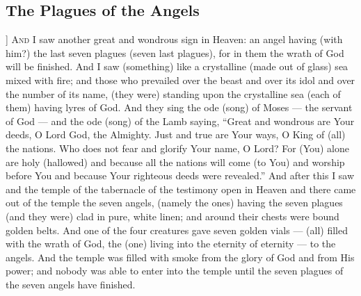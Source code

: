 \begin{pages}
\begin{Leftside}
        			\chapter{The Plagues of the Angels}
				]		
		\renewcommand{\LettrineFontHook}{\Zallmanfamily}
		\lettrine[lines=3]{A}{nd} I saw another great and wondrous sign in Heaven: an angel having (with him?) the last seven plagues (seven last plagues), for in them the wrath of God will be finished. And I saw (something) like a crystalline (made out of glass) sea mixed with fire; and those who prevailed over the beast and over its idol and over the number of its name, (they were) standing upon the crystalline sea (each of them) having lyres of God. 
		\pend
		\pstart
		And they sing the ode (song) of Moses — the servant of God — and the ode (song) of the Lamb saying, “Great and wondrous are Your deeds, O Lord God, the Almighty. Just and true are Your ways, O King of (all) the nations. Who does not fear and glorify Your name, O Lord? For (You) alone are holy (hallowed) and because all the nations will come (to You) and worship before You and because Your righteous deeds were revealed.”
		\pend
		\pstart
		And after this I saw and the temple of the tabernacle of the testimony open in Heaven and there came out of the temple the seven angels, (namely the ones) having the seven plagues (and they were) clad in pure, white linen; and around their chests were bound golden belts. And one of the four creatures gave seven golden vials — (all) filled with the wrath of God, the (one) living into the eternity of eternity — to the angels. And the temple was filled with smoke from the glory of God and from His power; and nobody was able to enter into the temple until the seven plagues of the seven angels have finished. 
		\pend
        \endnumbering
    \end{Leftside}

\end{pages} 
\Pages

